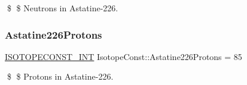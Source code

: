 \$ \$ Neutrons in Astatine-\/226. \mbox{\label{group___isotope_const-_astatine-_at226_gabe68e98ce5dc09f771412e1dc4392d17}} 
\subsubsection{\texorpdfstring{Astatine226\+Protons}{Astatine226Protons}}
{\footnotesize\ttfamily \mbox{\hyperlink{group___isotope_const-_macros_ga5f18360b3e99483a35c32d789e62621c}{I\+S\+O\+T\+O\+P\+E\+C\+O\+N\+S\+T\+\_\+\+I\+NT}} Isotope\+Const\+::\+Astatine226\+Protons = 85}

\$ \$ Protons in Astatine-\/226. 